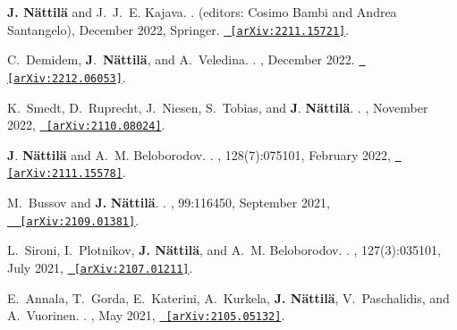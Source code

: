\documentclass[letterpaper, onecolumn, 11pt]{article}
\begin{document}
\begin{thebibliography}{10}


\textbf{J. N\"attil\"a} and J.~J.~E. {Kajava}.
.
\newblock (editors: Cosimo Bambi and Andrea Santangelo), December 2022, Springer.
\href{http://arxiv.org/abs/2211.15721}{\nolinkurl{ [arXiv:2211.15721]}}.

C.~{Demidem}, \textbf{J}.~{\textbf{N\"attil\"a}}, and A.~{Veledina}.
.
, December 2022.
\href{http://arxiv.org/abs/2212.06053}{\nolinkurl{ [arXiv:2212.06053]}}.

K.~{Smedt}, D.~{Ruprecht}, J.~{Niesen}, S.~{Tobias}, and \textbf{J}.
  {\textbf{N{\"a}ttil{\"a}}}.
.
, November 2022,
  \href{http://arxiv.org/abs/2110.08024}{\nolinkurl{ [arXiv:2110.08024]}}.

\textbf{J}. \textbf{N{\"a}ttil{\"a}} and A.~M. {Beloborodov}.
.
\newblock {\em \prl}, 128(7):075101, February 2022,
  \href{http://arxiv.org/abs/2111.15578}{\nolinkurl{ [arXiv:2111.15578]}}.


M.~{Bussov} and \textbf{J.} {\textbf{N{\"a}ttil{\"a}}}.
.
, 99:116450, September
  2021, \href{http://arxiv.org/abs/2109.01381}{\nolinkurl{
  [arXiv:2109.01381]}}.

L.~{Sironi}, I.~{Plotnikov}, \textbf{J. {N{\"a}ttil{\"a}}}, and A.~M.
  {Beloborodov}.
.
\newblock {\em \prl}, 127(3):035101, July 2021,
  \href{http://arxiv.org/abs/2107.01211}{\nolinkurl{ [arXiv:2107.01211]}}.

E.~{Annala}, T.~{Gorda}, E.~{Katerini}, A.~{Kurkela}, \textbf{J.
  {N{\"a}ttil{\"a}}}, V.~{Paschalidis}, and A.~{Vuorinen}.
.
, May 2021,
  \href{http://arxiv.org/abs/2105.05132}{\nolinkurl{ [arXiv:2105.05132]}}.


\end{thebibliography}
\end{document}
